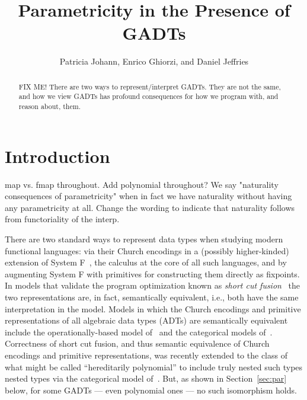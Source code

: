 \documentclass[acmsmall,screen,review,anonymous]{acmart}
\title[Parametricity in the Presence of GADTs]{Parametricity in the
  Presence of GADTs}
\author{Patricia Johann, Enrico Ghiorzi, and Daniel Jeffries}
\affiliation{ \institution{Appalachian State University}}
\theoremstyle{definition}
\begin{document}
\begin{abstract}
{\color{red} FIX ME!} There are two ways to represent/interpret
GADTs. They are not the same, and how we view GADTs has profound
consequences for how we program with, and reason about, them.
\end{abstract}

\maketitle

\section{Introduction}\label{sec:intro}
{\color{blue} map vs. fmap throughout.} {\color{blue} Add polynomial
  throughout?}
{\color{blue} We say "naturality consequences of parametricity"
when in fact we have naturality without having any parametricity at all.
Change the wording to indicate that naturality follows from
functoriality of the interp.}

There are two standard ways to represent data types when studying
modern functional languages: via their Church encodings in a (possibly
higher-kinded) extension of System F~\cite{gir72}, the calculus at the
core of all such languages, and by augmenting System F
with primitives for constructing them directly as fixpoints.
In models that validate the program optimization known as {\em short
  cut fusion}~\cite{glp93} the two representations are, in fact,
semantically equivalent, i.e., both have the same interpretation in
the model. Models in which the Church encodings and primitive
representations of all algebraic data types (ADTs) are semantically
equivalent include the operationally-based model of~\cite{pit98,pit00}
and the categorical models of~\cite{joh02,joh03}.
Correctness of short cut fusion, and thus semantic equivalence of
Church encodings and primitive representations, was recently extended
to the class of what might be called ``hereditarily polynomial''
{\color{blue} to include truly nested such types} nested types via the
categorical model of~\cite{jgj21}. But, as shown in
Section~\ref{sec:par} below, for some GADTs --- even polynomial ones
--- no such isomorphism holds.
\end{document}
